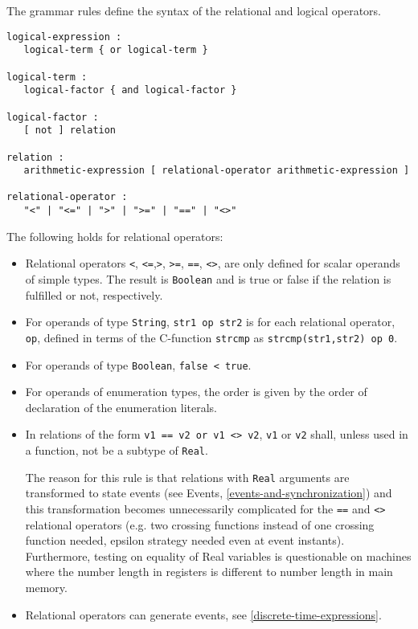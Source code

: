 The grammar rules define the syntax of the relational and logical
operators.

\begin{lstlisting}[language=grammar]
logical-expression :
   logical-term { or logical-term }

logical-term :
   logical-factor { and logical-factor }

logical-factor :
   [ not ] relation

relation :
   arithmetic-expression [ relational-operator arithmetic-expression ]

relational-operator :
   "<" | "<=" | ">" | ">=" | "==" | "<>"
\end{lstlisting}

The following holds for relational operators:
\begin{itemize}
\item
  Relational operators \lstinline!<!, \lstinline!<=!,\lstinline!>!,
\lstinline!>=!, \lstinline!==!, \lstinline!<>!, are only defined for
  scalar operands of simple types. The result is \lstinline!Boolean! and is true or
  false if the relation is fulfilled or not, respectively.
\item
  For operands of type \lstinline!String!, \lstinline!str1 op str2! is for each relational
  operator, \lstinline!op!, defined in terms of the C-function \lstinline!strcmp! as
  \lstinline!strcmp(str1,str2) op 0!.
\item
  For operands of type \lstinline!Boolean!, \lstinline!false < true!.
\item
  For operands of enumeration types, the order is given by the order of
  declaration of the enumeration literals.
\item
  In relations of the form \lstinline!v1 == v2 or v1 <> v2!,
  \lstinline!v1! or \lstinline!v2! shall, unless used in a function, not be a subtype of \lstinline!Real!.
  \begin{nonnormative}
  The reason for this rule is that relations with \lstinline!Real! arguments are transformed to state events (see Events, \autoref{events-and-synchronization})
  and this transformation becomes unnecessarily complicated for the \lstinline!==! and \lstinline!<>! relational operators (e.g. two crossing functions instead
  of one crossing function needed, epsilon strategy needed even at event instants). Furthermore, testing on equality of Real variables is questionable on machines
  where the number length in registers is different to number length in main memory.
  \end{nonnormative}
\item
  Relational operators can generate events, see \autoref{discrete-time-expressions}.
\end{itemize}

